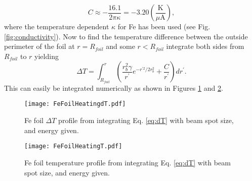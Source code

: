 \documentclass[12pt]{article}
\begin{document}
\[
C\approx-\frac{16.1}{2\pi\kappa}=-3.20\left(\frac{\textrm{K}}{\mu\textrm{A}}\right),
\]
where the temperature dependent $\kappa$ for Fe has been used (see Fig. \ref{fig:conductivity}). Now to find the temperature difference between the outside perimeter of the foil at $r=R_{foil}$ and some $r<R_{foil}$ integrate both sides from $R_{foil}$ to $r$ yielding
\begin{equation}
\label{eq:dT}
\Delta T = \int_{R_{foil}}^r \left(\frac{r_b^2\gamma}{r^{\prime}} e^{-r^{\prime 2}/2r_b^2}+\frac{C}{r^{\prime}}\right)dr^{\prime}.
\end{equation}
This can easily be integrated numerically as shown in Figures  \ref{fig:foilheating} and \ref{fig:foilheatingT}.
\begin{figure}[h]
\centering
\texttt{[image: FeFoilHeatingdT.pdf]}
\caption{\label{fig:foilheating}Fe foil $\Delta T$ profile from integrating Eq. \ref{eq:dT} with beam spot size, and energy given.}
\end{figure}
\begin{figure}[h]
\centering
\texttt{[image: FeFoilHeatingT.pdf]}
\caption{\label{fig:foilheatingT}Fe foil temperature profile from integrating Eq. \ref{eq:dT} with beam spot size, and energy given.}
\end{figure}
\end{document}
